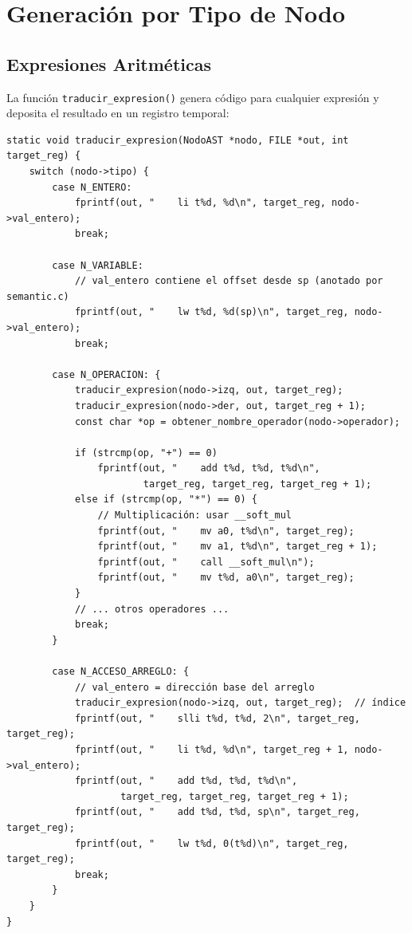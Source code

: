 \section{Generación por Tipo de Nodo}

\subsection{Expresiones Aritméticas}

La función \texttt{traducir\_expresion()} genera código para cualquier expresión y deposita el resultado en un registro temporal:

\begin{lstlisting}[style=cstyle, caption={Generación de expresiones en codegen.c}]
static void traducir_expresion(NodoAST *nodo, FILE *out, int target_reg) {
    switch (nodo->tipo) {
        case N_ENTERO:
            fprintf(out, "    li t%d, %d\n", target_reg, nodo->val_entero);
            break;
        
        case N_VARIABLE:
            // val_entero contiene el offset desde sp (anotado por semantic.c)
            fprintf(out, "    lw t%d, %d(sp)\n", target_reg, nodo->val_entero);
            break;
        
        case N_OPERACION: {
            traducir_expresion(nodo->izq, out, target_reg);
            traducir_expresion(nodo->der, out, target_reg + 1);
            const char *op = obtener_nombre_operador(nodo->operador);
            
            if (strcmp(op, "+") == 0)
                fprintf(out, "    add t%d, t%d, t%d\n", 
                        target_reg, target_reg, target_reg + 1);
            else if (strcmp(op, "*") == 0) {
                // Multiplicación: usar __soft_mul
                fprintf(out, "    mv a0, t%d\n", target_reg);
                fprintf(out, "    mv a1, t%d\n", target_reg + 1);
                fprintf(out, "    call __soft_mul\n");
                fprintf(out, "    mv t%d, a0\n", target_reg);
            }
            // ... otros operadores ...
            break;
        }
        
        case N_ACCESO_ARREGLO: {
            // val_entero = dirección base del arreglo
            traducir_expresion(nodo->izq, out, target_reg);  // índice
            fprintf(out, "    slli t%d, t%d, 2\n", target_reg, target_reg);
            fprintf(out, "    li t%d, %d\n", target_reg + 1, nodo->val_entero);
            fprintf(out, "    add t%d, t%d, t%d\n", 
                    target_reg, target_reg, target_reg + 1);
            fprintf(out, "    add t%d, t%d, sp\n", target_reg, target_reg);
            fprintf(out, "    lw t%d, 0(t%d)\n", target_reg, target_reg);
            break;
        }
    }
}
\end{lstlisting}

